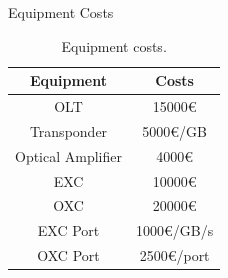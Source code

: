 Equipment Costs

\begin{table}[H]
	\centering
	\begin{tabular}{|c|c|}
		\hline
		Equipment         & Costs      \\ \hline
		OLT               & 15000\euro     \\ \hline
		Transponder       & 5000\euro/GB   \\ \hline
		Optical Amplifier & 4000\euro      \\ \hline
		EXC               & 10000\euro     \\ \hline
		OXC               & 20000\euro     \\ \hline
		EXC Port          & 1000\euro/GB/s \\ \hline
		OXC Port          & 2500\euro/port \\ \hline
	\end{tabular}
	\caption{Equipment costs.}
	\label{equipment_costs}
\end{table}


